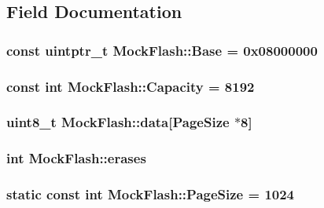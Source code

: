 \subsection{Field Documentation}
\hypertarget{structMockFlash_a16af64fcebb5ed292e35f7b2f5be7565}{
\subsubsection[{Base}]{\setlength{\rightskip}{0pt plus 5cm}const uintptr\+\_\+t Mock\+Flash\+::\+Base = 0x08000000\hspace{0.3cm}{\ttfamily [static]}}}\label{structMockFlash_a16af64fcebb5ed292e35f7b2f5be7565}
\hypertarget{structMockFlash_a03e630b5d32b831488ccebf392fe2bee}{
\subsubsection[{Capacity}]{\setlength{\rightskip}{0pt plus 5cm}const int Mock\+Flash\+::\+Capacity = 8192\hspace{0.3cm}{\ttfamily [static]}}}\label{structMockFlash_a03e630b5d32b831488ccebf392fe2bee}
\hypertarget{structMockFlash_af5c70a6bac20730ccf3eee2b969d3d41}{
\subsubsection[{data}]{\setlength{\rightskip}{0pt plus 5cm}uint8\+\_\+t Mock\+Flash\+::data\mbox{[}{\bf Page\+Size} $\ast$8\mbox{]}}}\label{structMockFlash_af5c70a6bac20730ccf3eee2b969d3d41}
\hypertarget{structMockFlash_a8d89a728bd9cbc547a679779e0d87566}{
\subsubsection[{erases}]{\setlength{\rightskip}{0pt plus 5cm}int Mock\+Flash\+::erases}}\label{structMockFlash_a8d89a728bd9cbc547a679779e0d87566}
\hypertarget{structMockFlash_a87985bd91e713fc6543801fd308e5406}{
\subsubsection[{Page\+Size}]{\setlength{\rightskip}{0pt plus 5cm}static const int Mock\+Flash\+::\+Page\+Size = 1024\hspace{0.3cm}{\ttfamily [static]}}}\label{structMockFlash_a87985bd91e713fc6543801fd308e5406}
